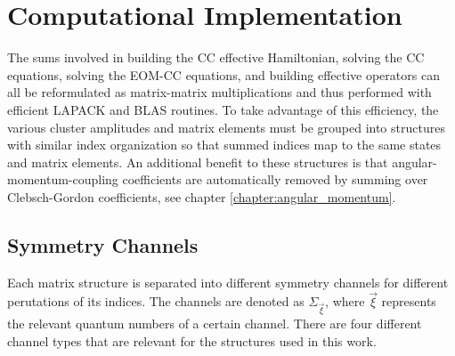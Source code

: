 \documentclass[thesis.tex]{subfiles}
\begin{document}
\chapter{Computational Implementation} \label{chapter:appendix_computational}

The sums involved in building the CC effective Hamiltonian, solving the CC equations, solving the EOM-CC equations, and building effective operators can all be reformulated as matrix-matrix multiplications and thus performed with efficient LAPACK and BLAS routines.  To take advantage of this efficiency, the various cluster amplitudes and matrix elements must be grouped into structures with similar index organization so that summed indices map to the same states and matrix elements.  An additional benefit to these structures is that angular-momentum-coupling coefficients are automatically removed by summing over Clebsch-Gordon coefficients, see chapter \ref{chapter:angular_momentum}.

\section{Symmetry Channels}

Each matrix structure is separated into different symmetry channels for different perutations of its indices.  The channels are denoted as $\Sigma_{\vec{\xi}}$, where $\vec{\xi}$ represents the relevant quantum numbers of a certain channel.  There are four different channel types that are relevant for the structures used in this work.
\end{document}

